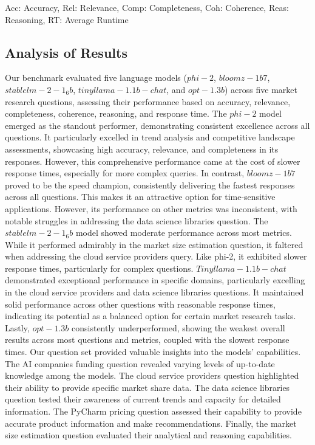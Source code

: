\documentclass[12pt,a4paper]{article}
\begin{document}
	\begin{flushleft}
		\small
		Acc: Accuracy, Rel: Relevance, Comp: Completeness, Coh: Coherence, Reas: Reasoning, RT: Average Runtime
	\end{flushleft}
	\subsection{Analysis of Results}
	Our benchmark evaluated five language models ($phi-2$, $bloomz-1b7$, $stablelm-2-1_6b$, $tinyllama-1.1b-chat$, and $opt-1.3b$) across five market research questions, assessing their performance based on accuracy, relevance, completeness, coherence, reasoning, and response time.
	The $phi-2$ model emerged as the standout performer, demonstrating consistent excellence across all questions. It particularly excelled in trend analysis and competitive landscape assessments, showcasing high accuracy, relevance, and completeness in its responses. However, this comprehensive performance came at the cost of slower response times, especially for more complex queries.
	In contrast, $bloomz-1b7$ proved to be the speed champion, consistently delivering the fastest responses across all questions. This makes it an attractive option for time-sensitive applications. However, its performance on other metrics was inconsistent, with notable struggles in addressing the data science libraries question.
	The $stablelm-2-1_6b$ model showed moderate performance across most metrics. While it performed admirably in the market size estimation question, it faltered when addressing the cloud service providers query. Like phi-2, it exhibited slower response times, particularly for complex questions.
	$Tinyllama-1.1b-chat$ demonstrated exceptional performance in specific domains, particularly excelling in the cloud service providers and data science libraries questions. It maintained solid performance across other questions with reasonable response times, indicating its potential as a balanced option for certain market research tasks.
	Lastly, $opt-1.3b$ consistently underperformed, showing the weakest overall results across most questions and metrics, coupled with the slowest response times.
	Our question set provided valuable insights into the models' capabilities. The AI companies funding question revealed varying levels of up-to-date knowledge among the models. The cloud service providers question highlighted their ability to provide specific market share data. The data science libraries question tested their awareness of current trends and capacity for detailed information. The PyCharm pricing question assessed their capability to provide accurate product information and make recommendations. Finally, the market size estimation question evaluated their analytical and reasoning capabilities.
\end{document}
